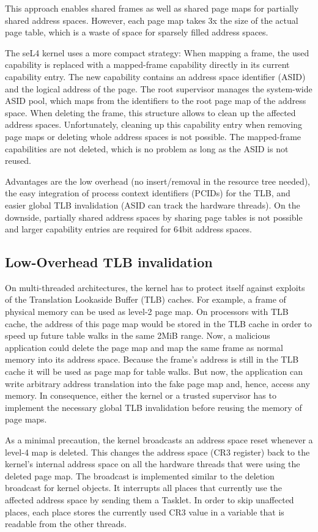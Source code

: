 This approach enables shared frames as well as shared page maps for partially shared address spaces. However, each page map takes 3x the size of the actual page table, which is a waste of space for sparsely filled address spaces.

The seL4 kernel uses a more compact strategy: When mapping a frame, the used capability is replaced with a mapped-frame capability directly in its current capability entry. The new capability contains an address space identifier (ASID) and the logical address of the page. The root supervisor manages the system-wide ASID pool, which maps from the identifiers to the root page map of the address space. When deleting the frame, this structure allows to clean up the affected address spaces. Unfortunately, cleaning up this capability entry when removing page maps or deleting whole address spaces is not possible. The mapped-frame capabilities are not deleted, which is no problem as long as the ASID is not reused. 

Advantages are the low overhead (no insert/removal in the resource tree needed), the easy integration of process context identifiers (PCIDs) for the TLB, and easier global TLB invalidation (ASID can track the hardware threads). On the downside, partially shared address spaces by sharing page tables is not possible and larger capability entries are required for 64bit address spaces. 

\subsection{Low-Overhead TLB invalidation}
On multi-threaded architectures, the kernel has to protect itself against exploits of the Translation Lookaside Buffer (TLB) caches. For example, a frame of physical memory can be used as level-2 page map. On processors with TLB cache, the address of this page map would be stored in the TLB cache in order to speed up future table walks in the same 2MiB range. Now, a malicious application could delete the page map and map the same frame as normal memory into its address space. Because the frame's address is still in the TLB cache it will be used as page map for table walks. But now, the application can write arbitrary address translation into the fake page map and, hence, access any memory. In consequence, either the kernel or a trusted supervisor has to implement the necessary global TLB invalidation before reusing the memory of page maps. 

As a minimal precaution, the kernel broadcasts an address space reset whenever a level-4 map is deleted. This changes the address space (CR3 register) back to the kernel's internal address space on all the hardware threads that were using the deleted page map. The broadcast is implemented similar to the deletion broadcast for kernel objects. It interrupts all places that currently use the affected address space by sending them a Tasklet. In order to skip unaffected places, each place stores the currently used CR3 value in a variable that is readable from the other threads.

